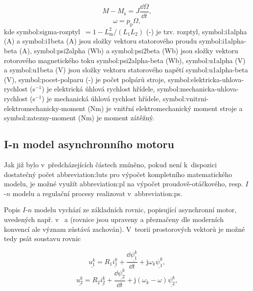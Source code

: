 \documentclass[a4paper, twoside, 11pt]{article}
\begin{document}
\begin{equation}
    M - M_\text{z} = J \frac{\dd{\Omega}}{\dd{t}},
\end{equation}
\begin{equation}
    \omega = p_\text{p} \Omega,
\end{equation}
kde \gls{symbol:sigma-rozptyl}~$= 1 - L_\text{m}^{2}/(L_1 L_2)$ (-) je tzv. rozptyl, \gls{symbol:i1alpha} (A) a \gls{symbol:i1beta} (A) jsou složky vektoru statorového proudu \gls{symbol:i1alpha-beta} (A), \gls{symbol:psi2alpha} (Wb) a \gls{symbol:psi2beta} (Wb) jsou složky vektoru rotorového magnetického toku \gls{symbol:psi2alpha-beta} (Wb), \gls{symbol:u1alpha} (V) a \gls{symbol:u1beta} (V) jsou složky vektoru statorového napětí \gls{symbol:u1alpha-beta} (V), \gls{symbol:pocet-polparu} (-) je počet polpárů stroje, \gls{symbol:elektricka-uhlova-rychlost} (s$^{-1}$) je elektrická úhlová rychlost hřídele, \gls{symbol:mechanicka-uhlova-rychlost} (s$^{-1}$) je mechanická úhlová rychlost hřídele, \gls{symbol:vnitrni-elektromechanicky-moment} (Nm) je vnitřní elektromechanický moment stroje a \gls{symbol:zatezny-moment} (Nm) je moment zátěžný.

	\subsection{I-n model asynchronního motoru}
		Jak již bylo v~předcházejících částech zmíněno, pokud není k~dispozici dostatečný počet \gls{abbreviation:luts} pro výpočet kompletního matematického modelu, je možné využít \gls{abbreviation:pl} na výpočet proudově-otáčkového, resp. $I$-$n$ modelu a regulační procesy realizovat v~\gls{abbreviation:ps}.\par
		Popis $I$-$n$ modelu vychází ze základních rovnic, popisující asynchronní motor, uvedených např. v~\cite{kobrle-elektricke-pohony} a \cite{lipcak-bauer-ept-moodle} (rovnice jsou upraveny a přeznačeny dle moderních konvencí ale význam zůstává zachován). V~teorii prostorových vektorů je možné tedy psát soustavu rovnic

		\begin{equation}
			\underline{u_{1}^{k}} = R_1 \underline{i_{1}^{k}} + \frac{\dd{\underline{\psi_1^{k}}}}{\dd{t}} + \text{j} \omega_k \underline{\psi_1^{k}},
		\end{equation}
		\begin{equation}
			\underline{u_{2}^{k}} = R_2 \underline{i_{2}^{k}} + \frac{\dd{\underline{\psi_2^{k}}}}{\dd{t}} + \text{j} (\omega_k - \omega) \underline{\psi_2^{k}},
		\end{equation}
	
\end{document}
